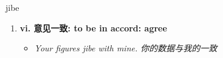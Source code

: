 
\begin{frame}
{\huge jibe}
\begin{center}
\begin{enumerate}\Large
  \item \textbf{vi. 意见一致: to be in accord: agree}
  \begin{itemize}
    \item \em{\Large{Your figures jibe with mine. 你的数据与我的一致}}
  \end{itemize}
\end{enumerate}
\end{center}
\end{frame}
